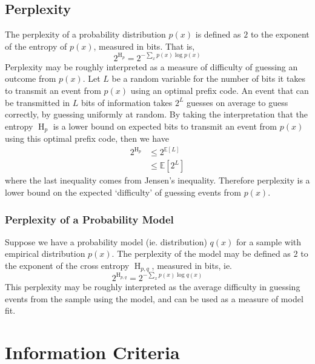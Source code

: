 \documentclass[11pt]{report} %
\begin{document}
\subsection{Perplexity}

The perplexity of a probability distribution $p\left(x\right)$ is defined as $2$ to the exponent of the entropy of $p\left(x\right)$, measured in bits. That is,
\begin{equation}
2^{\operatorname{H}_{p}} = 2^{-\sum_{x}p\left(x\right)\log p\left(x\right)}
\end{equation}
Perplexity may be roughly interpreted as a measure of difficulty of guessing an outcome from $p\left(x\right)$. Let $L$ be a random variable for the number of bits it takes to transmit an event from $p\left(x\right)$ using an optimal prefix code. An event that can be transmitted in $L$ bits of information takes $2^{L}$ guesses on average to guess correctly, by guessing uniformly at random.  By taking the interpretation that the entropy $\operatorname{H}_{p}$ is a lower bound on expected bits to transmit an event from $p\left(x\right)$ using this optimal prefix code, then we have
\begin{align}
2^{\operatorname{H}_{p}} &\leq 2^{\mathbb{E}\left[L\right]} \\
&\leq \mathbb{E}\left[2^{L}\right]
\end{align}
where the last inequality comes from Jensen's inequality. Therefore perplexity is a lower bound on the expected `difficulty' of guessing events from $p\left(x\right)$.

\subsubsection{Perplexity of a Probability Model}

Suppose we have a probability model (ie. distribution) $q\left(x\right)$ for a sample with empirical distribution $p\left(x\right)$. The perplexity of the model may be defined as $2$ to the exponent of the cross entropy $\operatorname{H}_{p, q}$, measured in bits, ie.
\begin{equation}
2^{\operatorname{H}_{p, q}} = 2^{-\sum_{x}p\left(x\right)\log q\left(x\right)}
\end{equation}
This perplexity may be roughly interpreted as the average difficulty in guessing events from the sample using the model, and can be used as a measure of model fit.

\section{Information Criteria}
\end{document}
